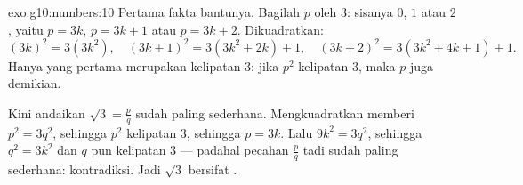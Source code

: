 \begin{solution}{exo:g10:numbers:10}
Pertama fakta bantunya. Bagilah $p$ oleh $3$: sisanya $0$, $1$ atau
$2$, yaitu $p = 3k$, $p = 3k+1$ atau $p = 3k+2$. Dikuadratkan:
\[
(3k)^2 = 3(3k^2), \quad
(3k+1)^2 = 3(3k^2 + 2k) + 1, \quad
(3k+2)^2 = 3(3k^2 + 4k + 1) + 1 .
\]
Hanya yang pertama merupakan kelipatan $3$: jika $p^2$ kelipatan $3$, maka
$p$ juga demikian.

Kini andaikan $\sqrt3 = \frac pq$ sudah paling sederhana. Mengkuadratkan
memberi $p^2 = 3q^2$, sehingga $p^2$ kelipatan $3$, sehingga $p = 3k$. Lalu
$9k^2 = 3q^2$, sehingga $q^2 = 3k^2$ dan $q$ pun kelipatan $3$ --- padahal
pecahan $\frac pq$ tadi sudah paling sederhana: kontradiksi. Jadi
$\sqrt3$ bersifat .
\end{solution}

